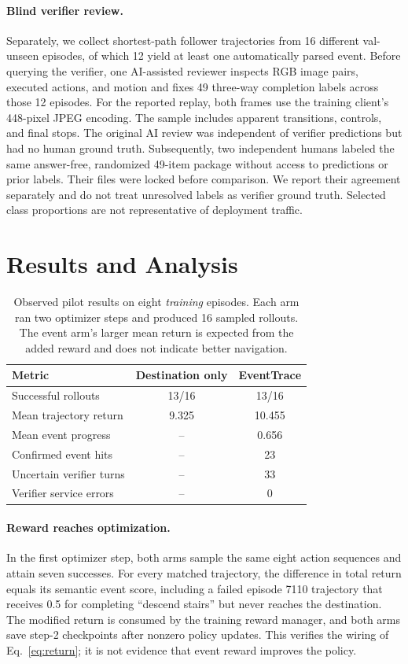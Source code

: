 \documentclass[10pt,twocolumn,letterpaper]{article}
\begin{document}
\paragraph{Blind verifier review.} Separately, we collect shortest-path follower trajectories from 16 different val-unseen episodes, of which 12 yield at least one automatically parsed event. Before querying the verifier, one AI-assisted reviewer inspects RGB image pairs, executed actions, and motion and fixes 49 three-way completion labels across those 12 episodes. For the reported replay, both frames use the training client's 448-pixel JPEG encoding. The sample includes apparent transitions, controls, and final stops. The original AI review was independent of verifier predictions but had no human ground truth. Subsequently, two independent humans labeled the same answer-free, randomized 49-item package without access to predictions or prior labels. Their files were locked before comparison. We report their agreement separately and do not treat unresolved labels as verifier ground truth. Selected class proportions are not representative of deployment traffic.

\section{Results and Analysis}
\begin{table}[t]
\centering
\caption{Observed pilot results on eight \emph{training} episodes. Each arm ran two optimizer steps and produced 16 sampled rollouts. The event arm's larger mean return is expected from the added reward and does not indicate better navigation.}
\label{tab:pilot}
\footnotesize
\begin{tabular}{lcc}
\toprule
Metric & Destination only & EventTrace \\
\midrule
Successful rollouts & 13/16 & 13/16 \\
Mean trajectory return & 9.325 & 10.455 \\
Mean event progress & -- & 0.656 \\
Confirmed event hits & -- & 23 \\
Uncertain verifier turns & -- & 33 \\
Verifier service errors & -- & 0 \\
\bottomrule
\end{tabular}
\end{table}

\paragraph{Reward reaches optimization.} In the first optimizer step, both arms sample the same eight action sequences and attain seven successes. For every matched trajectory, the difference in total return equals its semantic event score, including a failed episode 7110 trajectory that receives 0.5 for completing ``descend stairs'' but never reaches the destination. The modified return is consumed by the training reward manager, and both arms save step-2 checkpoints after nonzero policy updates. This verifies the wiring of Eq.~\ref{eq:return}; it is not evidence that event reward improves the policy.
\end{document}

